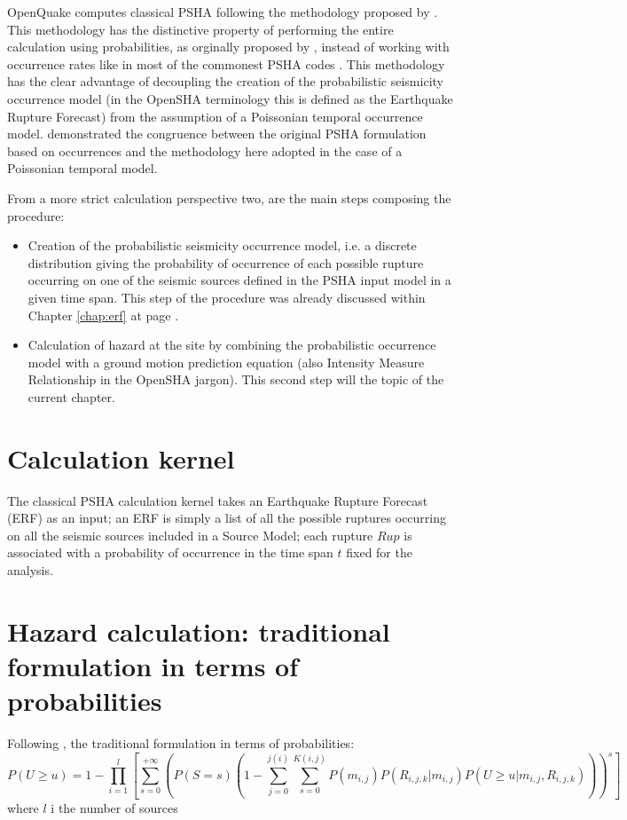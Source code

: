 OpenQuake computes classical PSHA 
\citep{cornell1968,mcguire2004} following the methodology proposed by 
\citet{field2003}. This methodology has the distinctive property of performing
the entire calculation using probabilities, as orginally proposed by 
\citet{chiang1984}, instead of working with occurrence rates like in most 
of the commonest PSHA codes \citep[see for instance][]{bender1987}. 
%
This methodology has the clear advantage of decoupling the creation of the 
probabilistic seismicity occurrence model (in the OpenSHA terminology this is 
defined as the Earthquake Rupture Forecast) from the assumption of a Poissonian 
temporal occurrence model. 
%
\citet{field2003} demonstrated the congruence between the original PSHA 
formulation based on occurrences and the methodology here adopted 
in the case of a Poissonian temporal model. 

From a more strict calculation perspective two, are the main steps composing the
procedure:
\begin{itemize}
\item Creation of the probabilistic seismicity occurrence model, i.e. a discrete 
distribution giving the probability of occurrence of each possible rupture 
occurring on one of the seismic sources defined in the PSHA input model in a  
given time span. This step of the procedure was already discussed within 
Chapter \ref{chap:erf} at page \pageref{chap:erf}.
\item Calculation of hazard at the site by combining the probabilistic 
occurrence model with a ground motion prediction equation (also Intensity 
Measure Relationship in the OpenSHA jargon). This second step will the topic 
of the current chapter.
\end{itemize}
%
\section{Calculation kernel}
The classical PSHA calculation kernel takes an Earthquake Rupture Forecast (ERF) 
as an input; an ERF is simply a list of all the possible ruptures occurring on 
all the seismic sources included in a Source Model; each rupture $Rup$ is  
associated with a probability of occurrence in the time span $t$ fixed for the 
analysis. 
 
%
\section{Hazard calculation: traditional formulation in terms of probabilities}
Following \cite{field2003}, the traditional formulation in terms of probabilities:
%
\begin{equation}
P(U\geq u)= 
	1-\prod\limits_{i=1}^{l} 
	\left[\sum\limits_{s=0}^{+\infty}
	\left(P(S=s) 
	\left(
		1-\sum\limits_{j=0}^{j(i)}\sum\limits_{s=0}^{K(i,j)} 
		P(m_{i,j}) 
		P(R_{i,j,k}|m_{i,j}) P(U\geq u|m_{i,j},R_{i,j,k})
	\right)
	\right)^{s}
	\right] 
\end{equation}
where $l$ i the number of sources 

